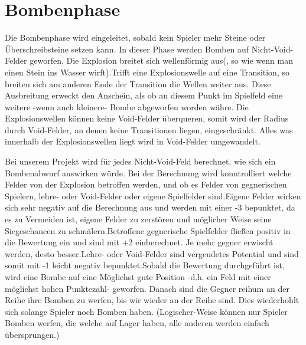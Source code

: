 \documentclass[12pt,a4paper]{article}
\begin{document}
\newpage
\section{Bombenphase}
Die Bombenphase wird eingeleitet, sobald kein Spieler mehr Steine oder Überschreibsteine setzen kann. In dieser Phase werden Bomben auf Nicht-Void-Felder geworfen. Die Explosion breitet sich wellenförmig aus(, so wie wenn man einen Stein ins Wasser wirft).Trifft eine Explosionswelle auf eine Transition, so breiten sich am anderen Ende der Transition die Wellen weiter aus. Diese Ausbreitung erweckt den Anschein, als ob an diesem Punkt im Spielfeld eine weitere -wenn auch kleinere- Bombe abgeworfen worden währe. Die Explosionswellen können keine Void-Felder überqueren, somit wird der Radius durch Void-Felder, an denen keine Transitionen liegen, eingeschränkt. Alles was innerhalb der Explosionswellen liegt wird in Void-Felder umgewandelt.

Bei unserem Projekt wird für jedes Nicht-Void-Feld berechnet, wie sich ein Bombenabwurf auswirken würde. Bei der Berechnung wird konntrolliert welche Felder von der Explosion betroffen werden, und ob es Felder von gegnerischen Spielern, lehre- oder Void-Felder oder eigene Spielfelder sind.\newline Eigene Felder wirken sich sehr negativ auf die Berechnung aus und werden mit einer -3 bepunktet, da es zu Vermeiden ist, eigene Felder zu zerstören und möglicher Weise seine Siegeschancen zu schmälern.\newline Betroffene gegnerische Spielfelder fließen positiv in die Bewertung ein und sind mit +2 einberechnet. Je mehr gegner erwischt werden, desto besser.\newline Lehre- oder Void-Felder sind vergeudetes Potential und sind somit mit -1 leicht negativ bepunktet.\newline Sobald die Bewertung durchgeführt ist, wird eine Bombe auf eine Möglichst gute Position -d.h. ein Feld mit einer möglichst hohen Punktezahl- geworfen. Danach sind die Gegner reihum an der Reihe ihre Bomben zu werfen, bis wir wieder an der Reihe sind. Dies wiederhohlt sich solange Spieler noch Bomben haben. (Logischer-Weise können nur Spieler Bomben werfen, die welche auf Lager haben, alle anderen werden einfach übersprungen.)
\newpage
\end{document}
